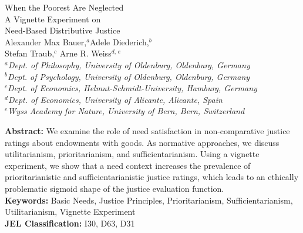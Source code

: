 \documentclass[12pt]{scrartcl}
\begin{document}
\thispagestyle{empty}
\renewcommand{\thefootnote}{\fnsymbol{footnote}}
\begin{center}
{\LARGE When the Poorest Are Neglected}\\\vspace{2ex}
{\Large A Vignette Experiment on\\[1ex] Need-Based Distributive Justice}\\ \vspace{6ex}
{\large Alexander Max Bauer,$^a$\footnotemark[1] Adele Diederich,$^b$\\Stefan Traub,$^{c}$ Arne R. Weiss$^{d,\,e}$}\\ \vspace{3ex}
\textsl{\small $^{a}$Dept. of Philosophy, University of Oldenburg, Oldenburg, Germany}\\\vspace{1ex}
\textsl{\small $^{b}$Dept. of Psychology, University of Oldenburg, Oldenburg, Germany}\\\vspace{1ex}
\textsl{\small $^{c}$Dept. of Economics, Helmut-Schmidt-University, Hamburg, Germany}\\\vspace{1ex}
\textsl{\small $^{d}$Dept. of Economics, University of Alicante, Alicante, Spain}\\\vspace{1ex}
\textsl{\small $^{e}$Wyss Academy for Nature, University of Bern, Bern, Switzerland}\\\vspace{4ex}

\end{center}

\vspace{\fill}

\noindent\textbf{Abstract:} We examine the role of need satisfaction in non-comparative justice ratings about endowments with goods. 
As normative approaches, we discuss utilitarianism, prioritarianism, and sufficientarianism.
Using a vignette experiment, we show that a need context increases the prevalence of prioritarianistic and sufficientarianistic justice ratings, which leads to an ethically problematic sigmoid shape of the justice evaluation function.
\\[2ex]
\noindent\textbf{Keywords:} Basic Needs, Justice Principles, Prioritarianism, Sufficientarianism, Utilitarianism, Vignette Experiment\\[2ex]
\textbf{JEL Classification:} I30, D63, D31
\end{document}

